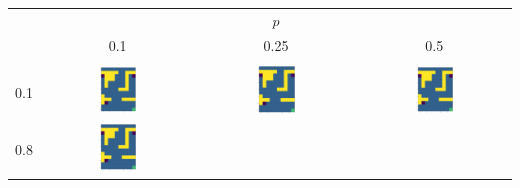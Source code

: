 \begin{center}
    \begin{tabular}{c | c  c  c}
        & & $p$ & \\
        & 0.1 & 0.25 & 0.5 \\
        \hline \\
        0.1 & 
            \includegraphics[width=0.26\textwidth]{assets/dp/analysis/prob_0.1_gamma_0.1_policy.png}
        & 
            \includegraphics[width=0.26\textwidth]{assets/dp/analysis/prob_0.25_gamma_0.1_policy.png}
        & 
            \includegraphics[width=0.26\textwidth]{assets/dp/analysis/prob_0.5_gamma_0.1_policy.png}
        \\
        0.8 &
            \includegraphics[width=0.26\textwidth]{assets/dp/analysis/prob_0.1_gamma_0.8_policy.png}

\end{tabular}
\end{center}
